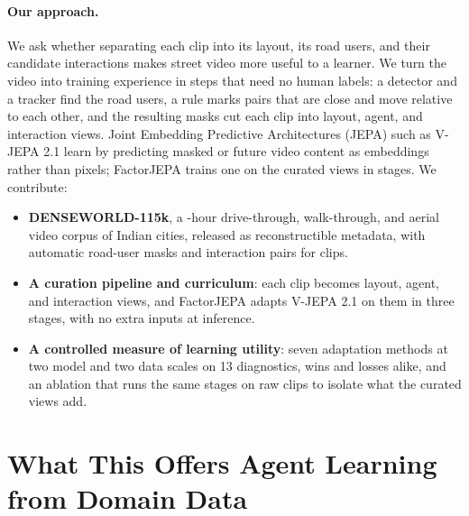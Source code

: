 \documentclass[letterpaper]{article} %
\begin{document}
\paragraph{Our approach.} We ask whether separating each clip into its layout, its road users, and their candidate interactions makes street video more useful to a learner. We turn the video into training experience in steps that need no human labels: a detector and a tracker find the road users, a rule marks pairs that are close and move relative to each other, and the resulting masks cut each clip into layout, agent, and interaction views. Joint Embedding Predictive Architectures (JEPA) such as V-JEPA 2.1 \cite{murlabadia2026vjepa21} learn by predicting masked or future video content as embeddings rather than pixels; FactorJEPA trains one on the curated views in stages. We contribute:
\begin{itemize}
    \item \textbf{DENSEWORLD-115k}, a \nHours{}-hour drive-through, walk-through, and aerial video corpus of \nCities{} Indian cities, released as reconstructible metadata, with automatic road-user masks and interaction pairs for \nAnnotated{} clips.
    \item \textbf{A curation pipeline and curriculum}: each clip becomes layout, agent, and interaction views, and FactorJEPA adapts V-JEPA 2.1 on them in three stages, with no extra inputs at inference.
    \item \textbf{A controlled measure of learning utility}: seven adaptation methods at two model and two data scales on 13 diagnostics, wins and losses alike, and an ablation that runs the same stages on raw clips to isolate what the curated views add.
\end{itemize}











\section{What This Offers Agent Learning from Domain Data}
\end{document}
